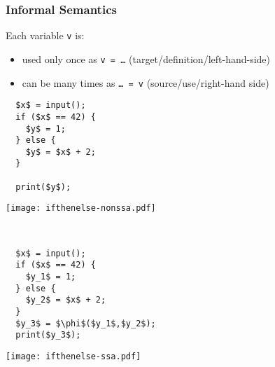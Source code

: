 \begin{frame}[fragile,label=inf-semantics]
\frametitle{Informal Semantics}
\vskip1cm
Each variable \texttt{v} is:
\begin{itemize}
  \item used only once as \alert{\texttt{v = \ldots}}
  \hfill (target/definition/left-hand-side)
\item can be many times as \alert{\texttt{\ldots\ = v}}
  \hfill (source/use/right-hand side)

\end{itemize}

%


\pause
\begin{overprint}
  \onslide<+>
  \hskip1cm
   \begin{minipage}{0.4\textwidth}%
\begin{lstlisting}
  $x$ = input();
  if ($x$ == 42) {
    $y$ = 1;
  } else {
    $y$ = $x$ + 2;
  }

  print($y$);
\end{lstlisting}
\end{minipage}
\begin{minipage}{0.5\textwidth}%
\vskip3mm
\texttt{[image: ifthenelse-nonssa.pdf]}
\end{minipage}

~\vspace{3cm}
%
\onslide<+->
\hskip1cm
\begin{minipage}{0.4\textwidth}
  \begin{center}
\begin{lstlisting}
  $x$ = input();
  if ($x$ == 42) {
    $y_1$ = 1;
  } else {
    $y_2$ = $x$ + 2;
  }
  $y_3$ = $\phi$($y_1$,$y_2$);
  print($y_3$);
\end{lstlisting}
  \end{center}
\end{minipage}
\begin{minipage}{0.4\textwidth}
\strut
\texttt{[image: ifthenelse-ssa.pdf]}
\end{minipage}
\end{overprint}


\end{frame}

